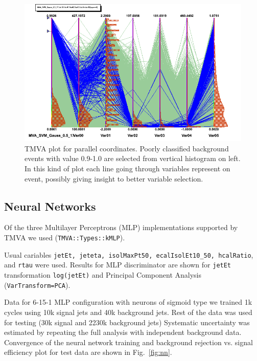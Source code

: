\documentclass[a4paper]{jpconf}
\begin{document}
\begin{figure}[h]
\begin{center}
\includegraphics[width=1.0\textwidth]{images/svm_parallels2.png}
  \caption{TMVA plot for parallel coordinates. 
Poorly classified background events with value 0.9-1.0 are selected from vertical histogram on left. 
In this kind of plot each line going through variables represent on event, 
possibly giving insight to better variable selection.}
  \label{fig:mkSvmParallels}

\end{center}
\end{figure}


\subsection{Neural Networks}

Of the three Multilayer Perceptrons (MLP) implementations supported by TMVA
we used ({\tt TMVA::Types::kMLP}).

Usual cariables {\tt jetEt, jeteta, isolMaxPt50, ecalIsolEt10\_50, hcalRatio}, and {\tt rtau}
were used. Results for MLP discriminator are shown for {\tt jetEt} transformation {\tt log(jetEt)} and 
Principal Component Analysis ({\tt  VarTransform=PCA}).

Data for 6-15-1 MLP configuration with neurons of sigmoid type we trained 1k cycles using
10k signal jets and 40k background jets. 
Rest of the data was used for testing (30k signal and 2230k background jets)
Systematic uncertainty was estimated by repeating the full analysis with independent background data.
Convergence of the neural network training and 
background rejection vs. signal efficiency plot  for test data are shown in Fig.~\ref{fig:nn}.
\end{document}
